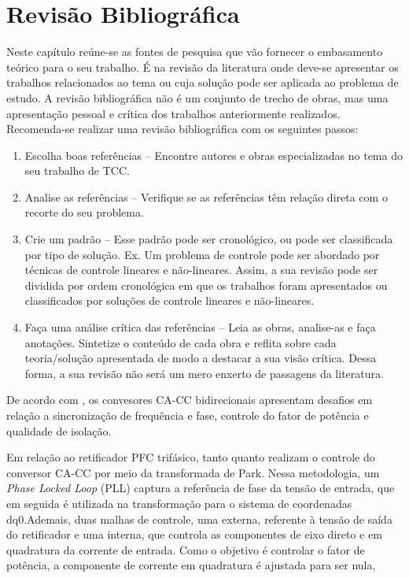 \chapter{Revisão Bibliográfica}
Neste capítulo reúne-se as fontes de pesquisa que vão fornecer o embasamento teórico para o seu 
trabalho. É na revisão da literatura onde deve-se apresentar os trabalhos relacionados ao tema 
ou cuja solução pode ser aplicada ao problema de estudo. A revisão bibliográfica não é um 
conjunto de trecho de obras, mas uma apresentação pessoal e crítica dos trabalhos anteriormente 
realizados. Recomenda-se realizar uma revisão bibliográfica com os seguintes passos:
\begin{enumerate}
	\item Escolha boas referências – Encontre autores e obras especializadas no tema do seu trabalho de TCC.
	\item Analise as referências – Verifique se as referências têm relação direta com o recorte do seu problema.
	\item Crie um padrão – Esse padrão pode ser cronológico, ou pode ser classificada por tipo de solução. Ex. Um problema de controle pode ser abordado por técnicas de controle lineares e não-lineares. Assim, a sua revisão pode ser dividida por ordem cronológica em que os trabalhos foram apresentados ou classificados por soluções de controle lineares e não-lineares. 
	\item Faça uma análise crítica das referências – Leia as obras, analise-as e faça anotações. Sintetize o conteúdo de cada obra e reflita sobre cada teoria/solução apresentada de modo a destacar a sua visão crítica. Dessa forma, a sua revisão não será um mero enxerto de passagens da literatura.
\end{enumerate}


De acordo com \cite{Kumar:2021}, os convesores CA-CC bidirecionais apresentam desafios em relação a sincronização de frequência e fase, controle do fator de potência
e qualidade de isolação. 

Em relação ao retificador PFC trifásico, tanto \cite{3phPlecs} quanto \cite{WANG2013/03} 
realizam o controle do conversor CA-CC por meio da transformada de Park. Nessa metodologia,
um \textit{Phase Locked Loop} (PLL) captura a referência de fase da tensão de entrada, que em seguida
 é utilizada na transformação para o sistema de coordenadas dq0.Ademais, duas malhas de controle, uma externa, referente à tensão de saída do retificador e uma interna,
 que controla as componentes de eixo direto e em quadratura da corrente de entrada. Como o objetivo é
 controlar o fator de potência, a componente de corrente em quadratura é ajustada para ser nula,

